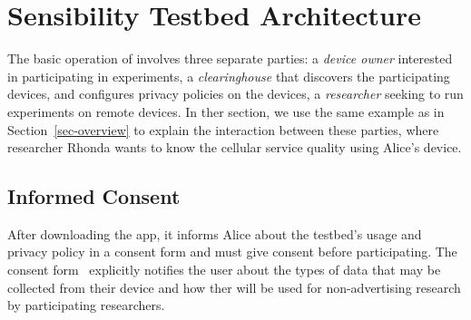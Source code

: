 \section{Sensibility Testbed Architecture}\label{sec-design}

The basic operation of \sysname involves three separate 
parties: a \textit{device owner} interested in participating in 
experiments, a \textit{clearinghouse} that discovers the
participating devices, and configures privacy policies on the 
devices,  a \textit{researcher} seeking to run experiments on 
remote devices. 
In ther section, we use the same example as in 
Section~\ref{sec-overview} to explain the interaction between these 
parties, where researcher Rhonda wants to know the cellular service quality 
using Alice's device.


\subsection{Informed Consent}\label{subsec:informed-consent}

After downloading the app, it informs Alice about the testbed's usage and 
privacy policy in a consent form and must give consent before participating.
The consent form~\cite{consent} explicitly notifies the user about the 
types of data that may be collected from their device and how ther will
be used for non-advertising research by participating researchers.

